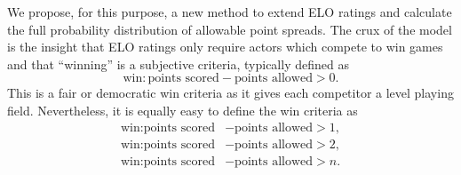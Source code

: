 \documentclass[aps,prc,reprint,amsmath,superscriptaddress]{revtex4-1}
\begin{document}
We propose, for this purpose, a new method to extend ELO ratings and calculate the full probability distribution of allowable point spreads.
The crux of the model is the insight that ELO ratings only require actors which compete to win games and that ``winning'' is a subjective criteria, typically defined as
\begin{equation}
  \text{win}: \text{points scored} - \text{points allowed} > 0.
\end{equation}
This is a fair or democratic win criteria as it gives each competitor a level playing field.
Nevertheless, it is equally easy to define the win criteria as
\begin{align}
  \text{win}: \text{points scored} &- \text{points allowed} > 1, \\
  \text{win}: \text{points scored} &- \text{points allowed} > 2, \\
  \text{win}: \text{points scored} &- \text{points allowed} > n.
\end{align}
\end{document}
